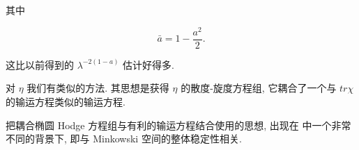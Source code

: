 其中

\[
\bar {a} = 1 - \frac {a ^ {2}}{2}.
\]

这比以前得到的 $\lambda^{-2(1 - a)}$ 估计好得多. 

\begin{remark}\label{rem:cG-3.21}
对 $\eta$ 我们有类似的方法. 其思想是获得 $\eta$ 的散度-旋度方程组, 它耦合了一个与 $tr\chi$ 的输运方程类似的输运方程. 
\end{remark}

\begin{remark}\label{rem:cG-3.22}
把耦合椭圆 Hodge 方程组与有利的输运方程结合使用的思想, 出现在 \cite{gfref12} 中一个非常不同的背景下, 即与 Minkowski 空间的整体稳定性相关. 
\end{remark}